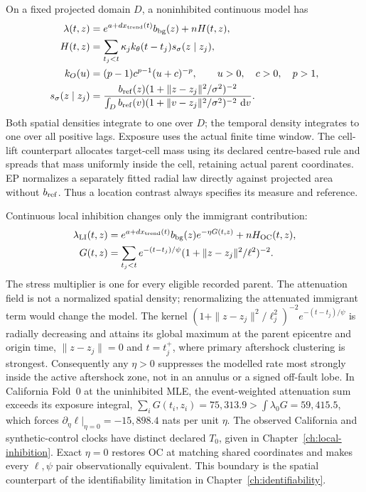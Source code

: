 On a fixed projected domain $D$, a noninhibited continuous model has
\begin{align}
 \lambda(t,z)&=e^{a+dx_{\mathrm{trend}}(t)}b_{\rm bg}(z)+nH(t,z),\label{eq:unified-spatial-law}\\
 H(t,z)&=\sum_{t_j<t}\kappa_j k_\theta(t-t_j)s_\sigma(z\mid z_j),\nonumber\\
 k_O(u)&=(p-1)c^{p-1}(u+c)^{-p},\qquad u>0,\quad c>0,\quad p>1,\nonumber\\
 s_\sigma(z\mid z_j)&=\frac{b_{\rm ref}(z)(1+\|z-z_j\|^2/\sigma^2)^{-2}}{\int_D b_{\rm ref}(v)(1+\|v-z_j\|^2/\sigma^2)^{-2}\,\mathop{}\!\mathrm{d} v}.\label{eq:unified-OC-density}
\end{align}
Both spatial densities integrate to one over $D$; the temporal density integrates to one over all positive lags. Exposure uses the actual finite time window. The cell-lift counterpart allocates target-cell mass using its declared centre-based rule and spreads that mass uniformly inside the cell, retaining actual parent coordinates. EP normalizes a separately fitted radial law directly against projected area without $b_{\rm ref}$. Thus a location contrast always specifies its measure and reference.

Continuous local inhibition changes only the immigrant contribution:
\begin{align}
 \lambda_{\rm LI}(t,z)&=e^{a+dx_{\mathrm{trend}}(t)}b_{\rm bg}(z)e^{-\eta G(t,z)}+nH_{\rm OC}(t,z),\label{eq:unified-LI}\\
 G(t,z)&=\sum_{t_j<t}e^{-(t-t_j)/\psi}(1+\|z-z_j\|^2/\ell^2)^{-2}.\nonumber
\end{align}
The stress multiplier is one for every eligible recorded parent. The attenuation field is not a normalized spatial density; renormalizing the attenuated immigrant term would change the model. The kernel $(1+\|z-z_j\|^2/\ell_j^2)^{-2}e^{-(t-t_j)/\psi}$ is radially decreasing and attains its global maximum at the parent epicentre and origin time, $\|z-z_j\|=0$ and $t=t_j^+$, where primary aftershock clustering is strongest. Consequently any $\eta>0$ suppresses the modelled rate most strongly inside the active aftershock zone, not in an annulus or a signed off-fault lobe. In California Fold~0 at the uninhibited MLE, the event-weighted attenuation sum exceeds its exposure integral, $\sum_iG(t_i,z_i)=75{,}313.9>\int\lambda_0G=59{,}415.5$, which forces $\partial_\eta\ell|_{\eta=0}=-15{,}898.4$ nats per unit $\eta$. The observed California and synthetic-control clocks have distinct declared $T_0$, given in Chapter~\ref{ch:local-inhibition}. Exact $\eta=0$ restores OC at matching shared coordinates and makes every $\ell,\psi$ pair observationally equivalent. This boundary is the spatial counterpart of the identifiability limitation in Chapter~\ref{ch:identifiability}.

